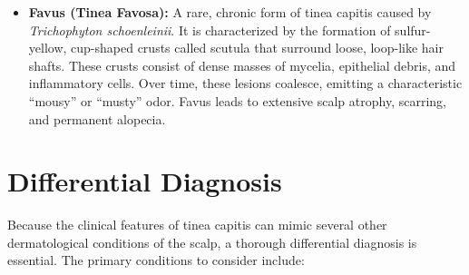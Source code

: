 \begin{itemize}
    \item \textbf{Favus (Tinea Favosa):} A rare, chronic form of tinea capitis caused by \textit{Trichophyton schoenleinii}. It is characterized by the formation of sulfur-yellow, cup-shaped crusts called scutula that surround loose, loop-like hair shafts. These crusts consist of dense masses of mycelia, epithelial debris, and inflammatory cells. Over time, these lesions coalesce, emitting a characteristic ``mousy'' or ``musty'' odor. Favus leads to extensive scalp atrophy, scarring, and permanent alopecia.
\end{itemize}

\section*{Differential Diagnosis}
Because the clinical features of tinea capitis can mimic several other dermatological conditions of the scalp, a thorough differential diagnosis is essential. The primary conditions to consider include:
